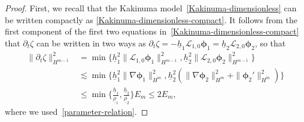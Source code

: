 \documentclass[11pt,leqno]{article}
\numberwithin{equation}{section}
\numberwithin{figure}{section}
\begin{document}
\begin{proof}
First, we recall that the Kakinuma model~\eqref{Kakinuma-dimensionless} can be written compactly as 
\eqref{Kakinuma-dimensionless-compact}. 
It follows from the first component of the first two equations in~\eqref{Kakinuma-dimensionless-compact} that 
$\partial_t\zeta$ can be written in two ways as 
$\partial_t\zeta=-\underline{h}_1\mathcal{L}_{1,0}\bm{\phi}_1=\underline{h}_2\mathcal{L}_{2,0}\bm{\phi}_2$, so that 
%
\begin{align*}
\|\partial_t\zeta\|_{H^{m-1}}^2
&= \min\{ \underline{h}_1^2\|\mathcal{L}_{1,0}\bm{\phi}_1\|_{H^{m-1}}^2, 
   \underline{h}_2^2\|\mathcal{L}_{2,0}\bm{\phi}_2\|_{H^{m-1}}^2 \} \\
&\lesssim \min\{ \underline{h}_1^2\|\nabla\bm{\phi}_1\|_{H^m}^2, 
   \underline{h}_2^2( \|\nabla\bm{\phi}_2\|_{H^m}^2 + \|\bm{\phi}_2'\|_{H^m}^2) \} \\
&\leq \min\biggl\{ \frac{\underline{h}_1}{\underline{\rho}_1}, \frac{\underline{h}_2}{\underline{\rho}_2} \biggr\} E_m
 \leq 2E_m,
\end{align*}
%
where we used~\eqref{parameter-relation}. 



\end{proof}
\end{document}
